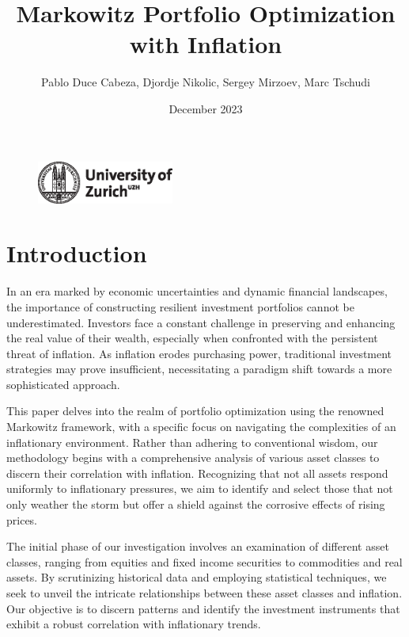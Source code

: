 \documentclass{article}
\title{Markowitz Portfolio Optimization with Inflation}
\author{Pablo Duce Cabeza, Djordje Nikolic, Sergey Mirzoev, Marc Tschudi}
\date{December 2023}
\begin{document}
\maketitle

\begin{figure}[h]
    \centering
    \includegraphics[width=0.4\textwidth]{figure/uzh_logo_e_pos.eps}
    \label{fig:mesh0}
\end{figure}

\newpage
\tableofcontents
\newpage
\listoffigures
\listoftables
\newpage

\section{Introduction}


In an era marked by economic uncertainties and dynamic financial landscapes, the importance of constructing resilient investment portfolios cannot be underestimated. Investors face a constant challenge in preserving and enhancing the real value of their wealth, especially when confronted with the persistent threat of inflation. As inflation erodes purchasing power, traditional investment strategies may prove insufficient, necessitating a paradigm shift towards a more sophisticated approach.

This paper delves into the realm of portfolio optimization using the renowned Markowitz framework, with a specific focus on navigating the complexities of an inflationary environment. Rather than adhering to conventional wisdom, our methodology begins with a comprehensive analysis of various asset classes to discern their correlation with inflation. Recognizing that not all assets respond uniformly to inflationary pressures, we aim to identify and select those that not only weather the storm but offer a shield against the corrosive effects of rising prices.

The initial phase of our investigation involves an examination of different asset classes, ranging from equities and fixed income securities to commodities and real assets. By scrutinizing historical data and employing statistical techniques, we seek to unveil the intricate relationships between these asset classes and inflation. Our objective is to discern patterns and identify the investment instruments that exhibit a robust correlation with inflationary trends.
\end{document}

